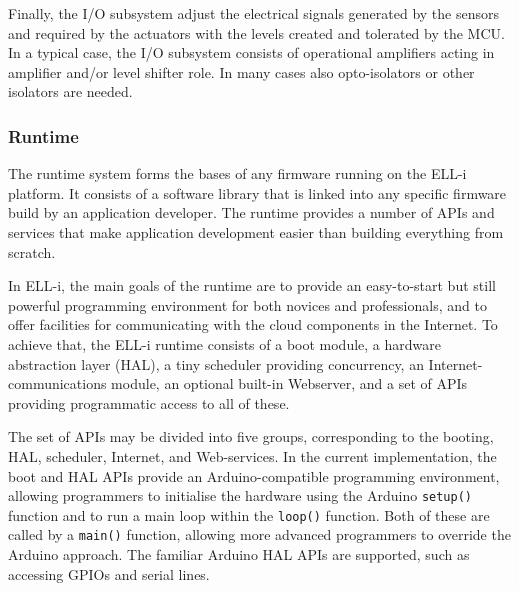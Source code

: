 \documentclass[final]{siamltex}
\begin{document}
Finally, the I/O subsystem adjust the electrical signals generated by
the sensors and required by the actuators with the levels created and
tolerated by the MCU.  In a typical case, the I/O subsystem consists
of operational amplifiers acting in amplifier and/or level shifter
role.  In many cases also opto-isolators or other isolators are needed.


\subsubsection{Runtime}
\label{sssec:runtime}

The runtime system forms the bases of any firmware running on the
ELL-i platform.  It consists of a software library that
is linked into any specific firmware build by an application
developer.  The runtime provides a number of APIs and services that make
application development easier than building everything from scratch.

In ELL-i, the main goals of the runtime are to provide an
easy-to-start but still powerful programming environment for both
novices and professionals, and to offer facilities for communicating
with the cloud components in the Internet.  To achieve that, the ELL-i
runtime consists of a boot module, a hardware abstraction layer (HAL),
a tiny scheduler providing concurrency, an Internet-communications
module, an optional built-in Webserver, and a set of APIs providing
programmatic access to all of these.


The set of APIs may be divided into five groups, corresponding to the
booting, HAL, scheduler, Internet, and Web-services.  In the current
implementation, the boot and HAL APIs provide an Arduino-compatible
programming environment, allowing programmers to initialise the
hardware using the Arduino \hbox{\tt setup()} function and to run a
main loop within the \hbox{\tt loop()} function.  Both of these are
called by a \hbox{\tt main()} function, allowing more advanced
programmers to override the Arduino approach.  The familiar Arduino
HAL APIs are supported, such as accessing GPIOs and serial lines.
\end{document}
